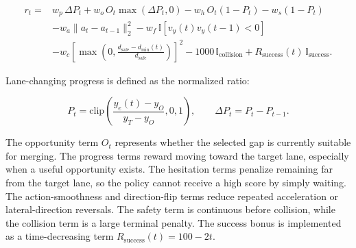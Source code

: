 {\small
\begin{equation}
\begin{aligned}
r_t
=&
w_p\,\Delta P_t
+w_o\,O_t\max(\Delta P_t,0)
-w_h\,O_t(1-P_t)
-w_s(1-P_t) \\
&
-w_a\lVert a_t-a_{t-1}\rVert_2^2
-w_f\,\mathbb{I}\!\left[v_y(t)v_y(t-1)<0\right] \\
&
-w_c
\left[
\max\left(0,\frac{d_{\mathrm{safe}}-d_{\min}(t)}{d_{\mathrm{safe}}}\right)
\right]^2
-1000\,\mathbb{I}_{\mathrm{collision}}
+R_{\mathrm{success}}(t)\,\mathbb{I}_{\mathrm{success}} .
\end{aligned}
\end{equation}
}





Lane-changing progress is defined as the normalized ratio:



{\small
\begin{equation}
P_t =
\mathrm{clip}
\left(
\frac{y_e(t)-y_O}{y_T-y_O},
0,
1
\right),
\qquad
\Delta P_t=P_t-P_{t-1}.
\end{equation}
}





The opportunity term \(O_t\) represents whether the selected gap is currently suitable for merging. The progress terms reward moving toward the target lane, especially when a useful opportunity exists. The hesitation terms penalize remaining far from the target lane, so the policy cannot receive a high score by simply waiting. The action-smoothness and direction-flip terms reduce repeated acceleration or lateral-direction reversals. The safety term is continuous before collision, while the collision term is a large terminal penalty. The success bonus is implemented as a time-decreasing term \(R_{\mathrm{success}}(t)=100-2t\).



